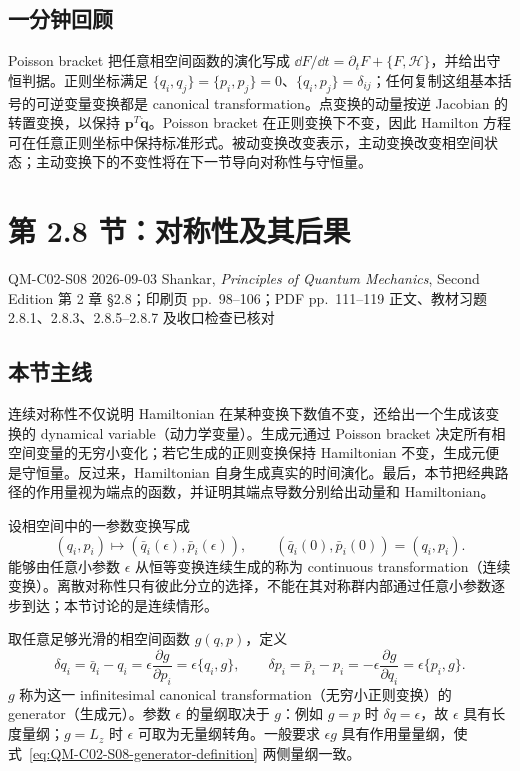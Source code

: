 \subsection{一分钟回顾}

Poisson bracket 把任意相空间函数的演化写成 $\dd F/\dd t=\partial_tF+\{F,\mathcal H\}$，并给出守恒判据。正则坐标满足 $\{q_i,q_j\}=\{p_i,p_j\}=0$、$\{q_i,p_j\}=\delta_{ij}$；任何复制这组基本括号的可逆变量变换都是 canonical transformation。点变换的动量按逆 Jacobian 的转置变换，以保持 $\bm p^T\dot{\bm q}$。Poisson bracket 在正则变换下不变，因此 Hamilton 方程可在任意正则坐标中保持标准形式。被动变换改变表示，主动变换改变相空间状态；主动变换下的不变性将在下一节导向对称性与守恒量。

\section{第 2.8 节：对称性及其后果}
\label{section:QM-C02-S08}

\studymeta
  {QM-C02-S08}
  {2026-09-03}
  {Shankar, \textit{Principles of Quantum Mechanics}, Second Edition}
  {第 2 章 \S 2.8；印刷页 pp.~98--106；PDF pp.~111--119}
  {正文、教材习题 2.8.1、2.8.3、2.8.5--2.8.7 及收口检查已核对}

\subsection{本节主线}

连续对称性不仅说明 Hamiltonian 在某种变换下数值不变，还给出一个生成该变换的 dynamical variable（动力学变量）。生成元通过 Poisson bracket 决定所有相空间变量的无穷小变化；若它生成的正则变换保持 Hamiltonian 不变，生成元便是守恒量。反过来，Hamiltonian 自身生成真实的时间演化。最后，本节把经典路径的作用量视为端点的函数，并证明其端点导数分别给出动量和 Hamiltonian。


设相空间中的一参数变换写成
\begin{equation}
  (q_i,p_i)\longmapsto
  (\bar q_i(\epsilon),\bar p_i(\epsilon)),
  \qquad
  (\bar q_i(0),\bar p_i(0))=(q_i,p_i).
  \label{eq:QM-C02-S08-one-parameter-family}
\end{equation}
能够由任意小参数 $\epsilon$ 从恒等变换连续生成的称为 continuous transformation（连续变换）。离散对称性只有彼此分立的选择，不能在其对称群内部通过任意小参数逐步到达；本节讨论的是连续情形。

取任意足够光滑的相空间函数 $g(q,p)$，定义
\begin{equation}
  \boxed{
  \delta q_i
  =\bar q_i-q_i
  =\epsilon\frac{\partial g}{\partial p_i}
  =\epsilon\{q_i,g\},
  \qquad
  \delta p_i
  =\bar p_i-p_i
  =-\epsilon\frac{\partial g}{\partial q_i}
  =\epsilon\{p_i,g\}.}
  \label{eq:QM-C02-S08-generator-definition}
\end{equation}
$g$ 称为这一 infinitesimal canonical transformation（无穷小正则变换）的 generator（生成元）。参数 $\epsilon$ 的量纲取决于 $g$：例如 $g=p$ 时 $\delta q=\epsilon$，故 $\epsilon$ 具有长度量纲；$g=L_z$ 时 $\epsilon$ 可取为无量纲转角。一般要求 $\epsilon g$ 具有作用量量纲，使式~\eqref{eq:QM-C02-S08-generator-definition} 两侧量纲一致。

